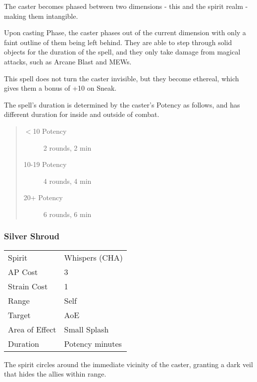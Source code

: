 \documentclass[11pt,a4paper,twocolumn]{book}
\begin{document}
\medskip

The caster becomes phased between two dimensions - this and the spirit realm - making them intangible.

Upon casting Phase, the caster phases out of the current dimension with only a faint outline of them being left behind. They are able to step through solid objects for the duration of the spell, and they only take damage from magical attacks, such as Arcane Blast and MEWs.

This spell does not turn the caster invisible, but they become ethereal, which gives them a bonus of +10 on Sneak.

The spell's duration is determined by the caster's Potency as follows, and has different duration for inside and outside of combat.

\begin{quote}
	\begin{description}
		\item[$<$10 Potency] 	2 rounds, 2 min
		\item[10-19 Potency] 	4 rounds, 4 min
		\item[20+ Potency] 		6 rounds, 6 min
	\end{description}	
\end{quote}



\subsubsection*{Silver Shroud}
{
	\begin{tabu} to 75mm{| X[l,4] | X[l,7] |}
		\hline
		Spirit         & Whispers (CHA)  \\
		AP Cost        & 3               \\
		Strain Cost    & 1               \\
		Range          & Self            \\
		Target         & AoE             \\
		Area of Effect & Small Splash    \\
		Duration       & Potency minutes \\ \hline
	\end{tabu}
	
}

\medskip

The spirit circles around the immediate vicinity of the caster, granting a dark veil that hides the allies within range.
\end{document}
